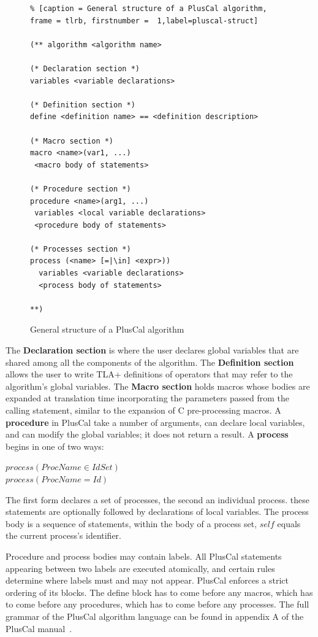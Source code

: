 \documentclass{thesul}
\begin{document}
\begin{figure}[!h]
\begin{lstlisting}% [caption = General structure of a PlusCal algorithm, frame = tlrb, firstnumber =  1,label=pluscal-struct]

(** algorithm <algorithm name>

(* Declaration section *)
variables <variable declarations>

(* Definition section *)
define <definition name> == <definition description>

(* Macro section *)
macro <name>(var1, ...)
 <macro body of statements>

(* Procedure section *)
procedure <name>(arg1, ...)
 variables <local variable declarations>
 <procedure body of statements>

(* Processes section *)
process (<name> [=|\in] <expr>))
  variables <variable declarations>
  <process body of statements>

**)

\end{lstlisting}
\caption{General structure of a PlusCal algorithm}
\label{pluscal-struct}
\end{figure}

The \textbf{Declaration section} is where the user declares global variables that are shared among all the components of the algorithm. The \textbf{Definition section} allows the user to write TLA+ definitions of operators that may refer to the algorithm's global variables.
The \textbf{Macro section} holds macros whose bodies are expanded at translation time incorporating the parameters passed from the calling statement, similar to the expansion of C pre-processing macros. A \textbf{procedure} in PlusCal take a number of arguments, can declare local variables, and can modify the global variables; it does not return a result. A \textbf{process} begins in one of two ways: 
\begin{center}
$process (ProcName \in IdSet)$ \\
$process (ProcName = Id)$
\end{center}

The first form declares a set of processes, the second an individual process. these statements are optionally followed by declarations of local variables. The process body is a sequence of statements, within the body of a process set, $self$ equals the current process's identifier.

Procedure and process bodies may contain labels. All PlusCal statements appearing between two labels are executed atomically, and certain rules determine where labels must and may not appear.
PlusCal enforces a strict ordering of its blocks. The define block has to come before any macros, which has to come before any procedures, which has to come before any processes. The full grammar of the PlusCal algorithm language can be found in appendix A of the PlusCal manual~\cite{pcalAlgo}.
\end{document}
